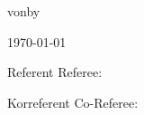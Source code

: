 \begin{titlepage}
\begin{center}
{von}{by}
\par\end{center}

\begin{center}
\theAuthor
\par\end{center}

\begin{center}
\today
\par\end{center}

\vspace{1.5cm}

{Referent}
{Referee}: \theFirstReferee

{Korreferent}
{Co-Referee}: \theSecondReferee

\end{titlepage}


\thispagestyle{empty}

\cleardoublepage

\printEidesstattlicheErklaerung

\clearpage

\printGenerativeAIDeclaration

\printGenderDisclaimer

\printDeclarationOfIndependence

\clearpage
\mbox{}\thispagestyle{empty}

